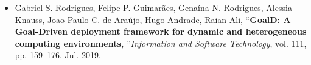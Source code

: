  \begin{itemize}
\item Gabriel S. Rodrigues, Felipe P. Guimarães, Genaína N. Rodrigues, Alessia Knauss, Joao Paulo C. de Araújo, Hugo Andrade, Raian Ali, “\textbf{GoalD: A Goal-Driven deployment framework for dynamic and heterogeneous computing environments, }”\textit{Information and Software Technology}, vol. 111, pp. 159–176, Jul. 2019.

\end{itemize}



